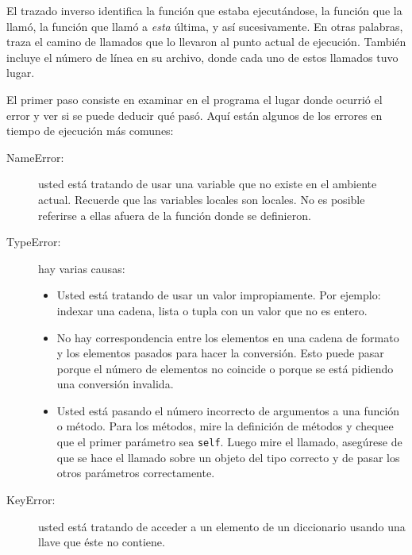 El trazado inverso identifica la función que estaba ejecutándose,
la función que la llamó, la función que llamó a {\em esta} última, y así
sucesivamente. En otras palabras, traza el camino de llamados que
lo llevaron al punto actual de ejecución. También incluye el 
número de línea en su archivo, donde cada uno de estos llamados
tuvo lugar.

El primer paso consiste en examinar en el programa el lugar donde 
ocurrió el error y ver si se puede deducir qué pasó. Aquí están
algunos de los errores en tiempo de ejecución más comunes:

\begin{description}

\item[NameError:]  usted está tratando de usar una variable que no
existe en el ambiente actual. 
Recuerde que las variables locales son locales. No es posible referirse
a ellas afuera de la función donde se definieron.


\item[TypeError:] hay varias causas:

\begin{itemize}

\item  Usted está tratando de usar un valor impropiamente. Por ejemplo:
indexar una cadena, lista o tupla con un valor que no es entero.


\item No hay correspondencia entre los elementos en una cadena de formato
y los elementos pasados para hacer la conversión. Esto puede pasar porque
el número de elementos no coincide o porque se está pidiendo una conversión
invalida.


\item Usted está pasando el número incorrecto de argumentos a una función
o método. Para los métodos, mire la definición de métodos y chequee que el
primer parámetro sea \texttt{self}.  Luego mire el llamado, asegúrese de
que se hace el llamado sobre un objeto del tipo correcto y de pasar los
otros parámetros correctamente.


\end{itemize}

\item[KeyError:]  usted está tratando de acceder a un elemento de un 
diccionario usando una llave que éste no contiene.


\end{description}
